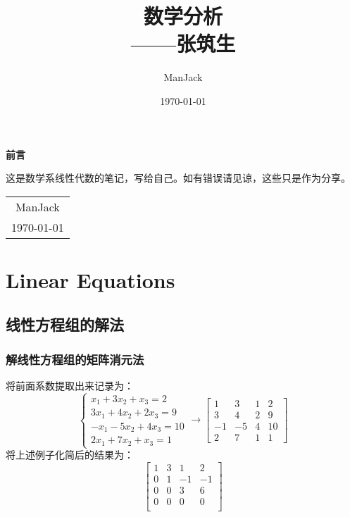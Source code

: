 \documentclass[10pt, a4paper, oneside, UTF8]{ctexbook}
\title{{\Huge{\textbf{数学分析}}}\\------张筑生}
\author{ManJack}
\date{\today}
\begin{document}
\maketitle

\setcounter{page}{1}

\newpage
\begin{center}
  \Huge\textbf{前言}
\end{center}

这是数学系线性代数的笔记，写给自己。如有错误请见谅，这些只是作为分享。

\begin{flushright}
  \begin{tabular}{c}
    ManJack \\
    \today
  \end{tabular}
\end{flushright}

\newpage
\tableofcontents
\newpage
{}
\setcounter{page}{1}

\chapter{Linear Equations}


\section*{线性方程组的解法}

\subsection*{解线性方程组的矩阵消元法}

\begin{example}
  将前面系数提取出来记录为：
  \[
    \begin{cases}
      x_1+3x_{2}+x_3=2 \\
      3x_1+4x_2+2x_3 = 9 \\
      -x_1-5x_{2}+4x_{3} = 10\\
      2x_{1}+7x_{2} +x_{3}= 1
    \end{cases}
    \longrightarrow
    \begin{bmatrix}
      1 &3&1&2\\
      3&4&2&9\\
      -1&-5&4&10\\
      2&7&1&1
    \end{bmatrix}
  \]
  将上述例子化简后的结果为：
  \[
    \begin{bmatrix}
      1 & 3 & 1 & 2 \\
      0 & 1 & -1 & -1 \\
      0 & 0 & 3 & 6 \\
      0 & 0 & 0 & 0 \\
    \end{bmatrix}
  \]
\end{example}
\end{document}
